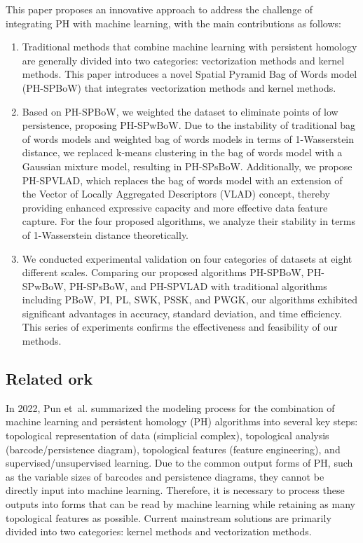 \documentclass[5GeSdc,ASOC,numref,printGA,printHL,CASflow,nocrossmark,longtitle,PROOF]{/usr/local/texlive/iTemplates/01-Templates/01-Els-Jnl/01-Standard_Templates/V1/ELS_MDL5-V1-6}
\begin{document}
\begin{articlestyle}
This paper proposes an innovative approach to address the challenge of integrating PH with machine learning, with the main contributions as follows:\vspace*{-3pt}  
\begin{enumerate} 
	\item[(1)] Traditional methods that combine machine learning with persistent homology are generally divided into two categories: vectorization methods and kernel methods. This paper introduces a novel Spatial Pyramid Bag of Words model (PH-SPBoW) that integrates vectorization methods and kernel methods.
	\item[(2)] Based on PH-SPBoW, we weighted the dataset to eliminate points of low persistence, proposing PH-SPwBoW. Due to the instability of traditional bag of words models and weighted bag of words models in terms of 1-Wasserstein distance, we replaced k-means clustering in the bag of words model with a Gaussian mixture model, resulting in PH-SPsBoW. Additionally, we propose PH-SPVLAD, which replaces the bag of words model with an extension of the Vector of Locally Aggregated Descriptors (VLAD) concept, thereby providing enhanced expressive capacity and more effective data feature capture. For the four proposed algorithms, we analyze their stability in terms of 1-Wasserstein distance theoretically.
	\item[(3)] We conducted experimental validation on four categories of datasets at eight different scales. Comparing our proposed algorithms PH-SPBoW, PH-SPwBoW, PH-SPsBoW, and PH-SPVLAD with traditional algorithms including PBoW, PI, PL, SWK, PSSK, and PWGK, our algorithms exhibited significant advantages in accuracy, standard deviation, and time efficiency. This series of experiments confirms the effectiveness and feasibility of our methods.\vspace*{-3pt}
\end{enumerate}

\enlargethispage*{-2pt}
\subsection{Related ork}\label{sec1.1}

In 2022, Pun et~al. \cite{pun2022persistent} summarized the modeling process for the combination of machine learning and persistent homology (PH) algorithms into several key steps: topological representation of data (simplicial complex), topological analysis (barcode/persistence diagram), topological features (feature engineering), and supervised/unsupervised learning. Due to the common output forms of PH, such as the variable sizes of barcodes and persistence diagrams, they cannot be directly input into machine learning. Therefore, it is necessary to process these outputs into forms that can be read by machine learning while retaining as many topological features as possible. Current mainstream solutions are primarily divided into two categories: kernel methods and vectorization methods.


\end{articlestyle}
\end{document}
